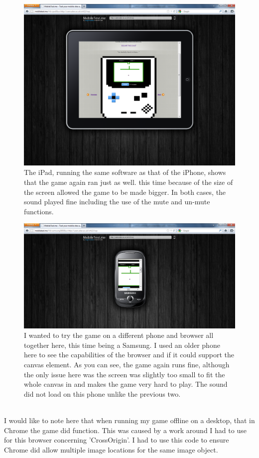 \documentclass[a4paper]{article}
\begin{document}
 \begin{figure}[!ht]
   \centering
   \includegraphics[scale=0.35]{ipad.png}
  \caption{The iPad, running the same software as that of the iPhone, shows that
the game again ran just as well. this time because of the size of the screen
allowed the game to be made bigger. In both cases, the sound played fine
including the use of the mute and un-mute functions.}
   \end{figure}
 \begin{figure}[!ht]
   \centering
   \includegraphics[scale=0.5]{sony.png}
  \caption{I wanted to try the game on a different phone and browser all
together here, this time being a Samsung. I used an older phone here to see the
capabilities of the browser and if it could support the canvas element. As you
can see, the game again runs fine, although the only issue here was the screen
was slightly too small to fit the whole canvas in and makes the game very hard
to play. The sound did not load on this phone unlike the previous two.}
   \end{figure}
\\I would like to note here that when running my game offline on a desktop, that
in Chrome the game did function. This was caused by a work around I had to use
for this browser concerning 'CrossOrigin'. I had to use this code to ensure
Chrome did allow multiple image locations for the same image object. \\
\\
 
\end{document}
